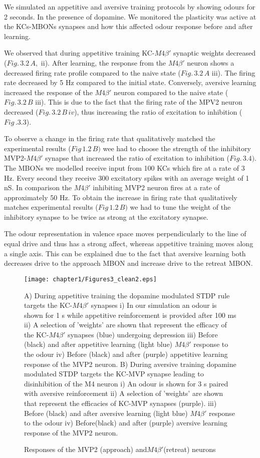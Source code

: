 We simulated an appetitive and aversive training protocols by showing
odours for 2 seconds. In the presence of dopamine. We monitored the
plasticity was active at the KCs-MBONs synapses and how this affected
odour response before and after learning. 

We observed that during appetitive training KC-$M4\beta'$  synaptic
weights decreased ($Fig.\,3.2\,A,$ ii). After learning, the response
from the $M4\beta'$  neuron shows a decreased firing rate profile
compared to the naive state ($Fig.\,3.2\,A$ iii). The firing rate
decreased by 5 Hz compared to the initial state. Conversely, aversive
learning increased the response of the $M4\beta'$  neuron compared
to the naive state ($Fig.\,3.2\,B$ iii). This is due to the fact
that the firing rate of the MPV2 neuron decreased ($Fig.\,3.2\,B\,iv$),
thus increasing the ratio of excitation to inhibition ($Fig\,.3.3$).

To observe a change in the firing rate that qualitatively matched
the experimental results ($Fig\,1.2\,B)$ wee had to choose the strength
of the inhibitory MVP2-$M4\beta'$ synapse that increased the ratio
of excitation to inhibition ($Fig.\,3.4)$. The MBONs we modelled
receive input from 100 KCs which fire at a rate of 3 Hz. Every second
they receive 300 excitatory spikes with an average weight of 1 nS.
In comparison the $M4\beta'$  inhibiting MVP2 neuron fires at a rate
of approximately 50 Hz. To obtain the increase in firing rate that
qualitatively matches experimental results ($Fig\,1.2\,B)$ we had
to tune the weight of the inhibitory synapse to be twice as strong
at the excitatory synapse. 

The odour representation in valence space moves perpendicularly to
the line of equal drive and thus has a strong affect, whereas appetitive
training moves along a single axis. This can be explained due to the
fact that aversive learning both decreases drive to the approach MBON
and increase drive to the retreat MBON. 


\begin{figure}[H]
%
\texttt{[image: chapter1/Figures3\_clean2.eps]} {\caption[text to list of
figures]{%
 Responses of the MVP2 (approach) and$M4\beta'$(retreat) neurons%
}
}

A) During appetitive training the dopamine modulated STDP rule targets
the KC-$M4\beta'$  synapses i) In our simulation an odour is shown
for 1 s while appetitive reinforcement is provided after 100 ms ii)
A selection of 'weights' are shown that represent the efficacy of
the KC-$M4\beta'$  synapses (blue) undergoing depression iii) Before
(black) and after appetitive learning (light blue) $M4\beta'$ response
to the odour iv) Before (black) and after (purple) appetitive learning
response of the MVP2 neuron. B) During aversive training dopamine
modulated STDP targets the KC-MVP synapse leading to disinhibition
of the M4 neuron i) An odour is shown for 3 s paired with aversive
reinforcement ii) A selection of 'weights' are shown that represent
the efficacies of KC-MVP synapses (purple). iii) Before (black) and
after aversive learning (light blue) $M4\beta'$ response to the odour
iv) Before(black) and after (purple) aversive learning response of
the MVP2 neuron.%
\end{figure}


